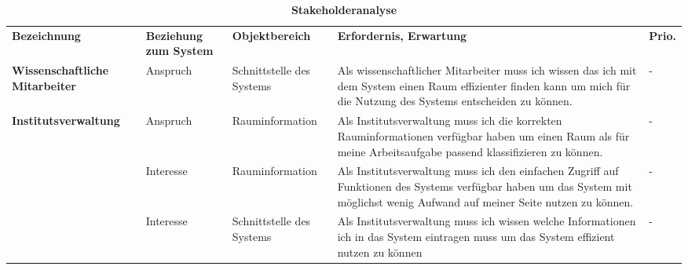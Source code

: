 \begin{table}[h]
	
 	\caption{\textbf{Stakeholderanalyse}}
 	\begin{tabularx}{\textwidth}{|X|X|X|X|m{}|}			
 		\rowcolor{heading}\textbf{Bezeichnung} & \textbf{Beziehung zum System} & \textbf{Objektbereich} & \textbf{Erfordernis, Erwartung} & \textbf{Prio.}\\
			 
 	\textbf{Wissenschaftliche Mitarbeiter} & Anspruch & Schnittstelle des Systems & Als wissenschaftlicher Mitarbeiter muss ich wissen das ich mit dem System einen Raum effizienter finden kann um mich für die Nutzung des Systems entscheiden zu können. & -\\
\rowcolor{odd} \textbf{Institutsverwaltung} & Anspruch & Rauminformation & Als Institutsverwaltung muss ich die korrekten Rauminformationen verfügbar haben um einen Raum als für meine Arbeitsaufgabe passend klassifizieren zu können. & -\\
	& Interesse & Rauminformation & Als Institutsverwaltung muss ich den einfachen Zugriff auf Funktionen des Systems verfügbar haben um das System mit möglichst wenig Aufwand auf meiner Seite nutzen zu können. & -\\
\rowcolor{odd} & Interesse & Schnittstelle des Systems & Als Institutsverwaltung muss ich wissen welche Informationen ich in das System eintragen muss um das System effizient nutzen zu können & -\\ \hline
 	\end{tabularx}
 	
\end{table}

